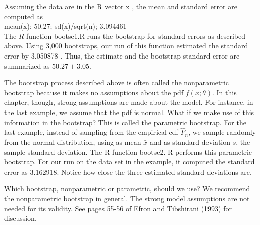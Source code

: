 Assuming the data are in the R vector x , the mean and standard error are computed as\\
mean(x); 50.27; sd(x)/sqrt(n); 3.094461\\
The $R$ function bootse1.R runs the bootstrap for standard errors as described above. Using 3,000 bootstraps, our run of this function estimated the standard error by 3.050878 . Thus, the estimate and the bootstrap standard error are summarized as $50.27 \pm 3.05$.

The bootstrap process described above is often called the nonparametric bootstrap because it makes no assumptions about the pdf $f(x ; \theta)$. In this chapter, though, strong assumptions are made about the model. For instance, in the last example, we assume that the pdf is normal. What if we make use of this information in the bootstrap? This is called the parametric bootstrap. For the last example, instead of sampling from the empirical cdf $\widehat{F}_{n}$, we sample randomly from the normal distribution, using as mean $\bar{x}$ and as standard deviation $s$, the sample standard deviation. The R function bootse2. R performs this parametric bootstrap. For our run on the data set in the example, it computed the standard error as 3.162918. Notice how close the three estimated standard deviations are.

Which bootstrap, nonparametric or parametric, should we use? We recommend the nonparametric bootstrap in general. The strong model assumptions are not needed for its validity. See pages 55-56 of Efron and Tibshirani (1993) for discussion.

